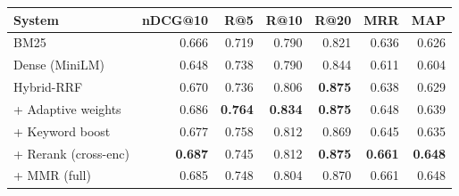 \begin{tabular}{lrrrrrr}
\toprule
System & nDCG@10 & R@5 & R@10 & R@20 & MRR & MAP \\
\midrule
BM25 & 0.666 & 0.719 & 0.790 & 0.821 & 0.636 & 0.626 \\
Dense (MiniLM) & 0.648 & 0.738 & 0.790 & 0.844 & 0.611 & 0.604 \\
\midrule
Hybrid-RRF & 0.670 & 0.736 & 0.806 & \textbf{0.875} & 0.638 & 0.629 \\
+ Adaptive weights & 0.686 & \textbf{0.764} & \textbf{0.834} & \textbf{0.875} & 0.648 & 0.639 \\
+ Keyword boost & 0.677 & 0.758 & 0.812 & 0.869 & 0.645 & 0.635 \\
+ Rerank (cross-enc) & \textbf{0.687} & 0.745 & 0.812 & \textbf{0.875} & \textbf{0.661} & \textbf{0.648} \\
+ MMR (full) & 0.685 & 0.748 & 0.804 & 0.870 & 0.661 & 0.648 \\
\bottomrule
\end{tabular}
